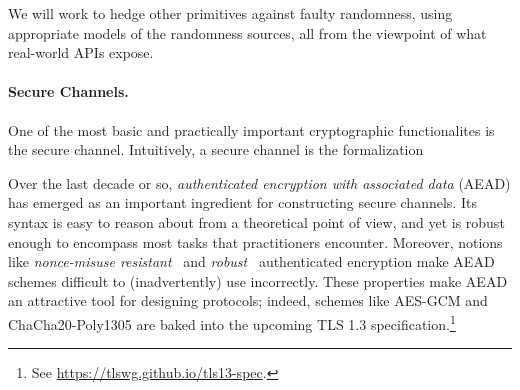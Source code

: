 \begin{task}
We will work to hedge other primitives against faulty randomness,
using appropriate models of the randomness sources, all from the
viewpoint of what real-world APIs expose.
\end{task}


\paragraph{Secure Channels. }  One of the most basic and practically
important cryptographic functionalites is the secure channel.
Intuitively, a secure channel is the formalization
%
Over the last decade or so, \emph{authenticated encryption with associated data}
(AEAD) has emerged as an important ingredient for constructing secure channels.
%
Its syntax is easy to reason about from a theoretical point of view, and yet is
robust enough to encompass most tasks that practitioners encounter. Moreover,
notions like \emph{nonce-misuse resistant}~\cite{RS07} and
\emph{robust}~\cite{HKR14} authenticated encryption make AEAD schemes difficult
to (inadvertently) use incorrectly. These properties make AEAD an attractive
tool for designing protocols; indeed, schemes like AES-GCM and
ChaCha20\mbox{-}Poly1305 are baked into the upcoming TLS 1.3
specification.\footnote{ See \url{https://tlswg.github.io/tls13-spec}.}

